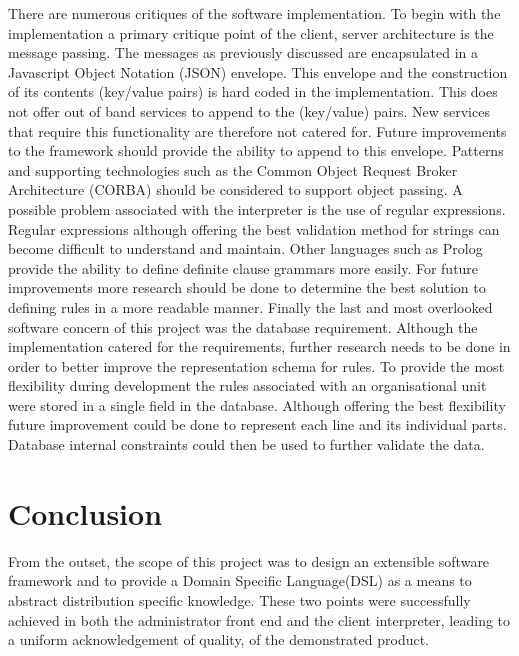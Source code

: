 		\normalsize
		{
			There are numerous critiques of the software implementation.
			To begin with the implementation a primary critique point of the client, server architecture is the message passing.
			The messages as previously discussed are encapsulated in a Javascript Object Notation (JSON) envelope.  
			This envelope and the construction of its contents (key/value pairs) is hard coded in the implementation.  
			This does not offer out of band services to append to the (key/value) pairs.
			New services that require this functionality are therefore not catered for.
			Future improvements to the framework should provide the ability to append to this envelope.
			\newline
			\newline
			Patterns and supporting technologies such as the Common Object Request Broker Architecture (CORBA) should be considered
			to support object passing.
			\newline
			\newline
			A possible problem associated with the interpreter is the use of regular expressions.  Regular expressions
			although offering the best validation method for strings can become difficult to understand and maintain.
			Other languages such as Prolog provide the ability to define definite clause grammars more easily.
			For future improvements more research should be done to determine the best solution to defining rules
			in a more readable manner.
			\newline
			\newline
			Finally the last and most overlooked software concern of this project was the database requirement.
			Although the implementation catered for the requirements, further research needs to be done
			in order to better improve the representation schema for rules.  To provide the most flexibility during development
			the rules associated with an organisational unit were stored in a single field in the database.
			Although offering the best flexibility future improvement could be done to represent each line and its individual parts.
			Database internal constraints could then be used to further validate the data.
			\newline
		}
		
	\section{Conclusion}
	
		\normalsize
		{
			From the outset, the scope of this project was to design an extensible software framework and to provide a Domain Specific Language(DSL)
			as a means to abstract distribution specific knowledge.  These two points were successfully achieved in both the administrator front end and 
			the	client interpreter, leading to a uniform acknowledgement of quality, of the demonstrated product.	
			\newline
			\newline
		}
